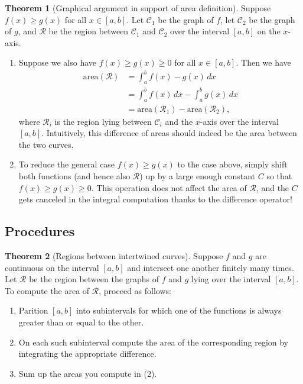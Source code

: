 \documentclass[11pt]{article}
\theoremstyle{definition}
\theoremstyle{named}
\newtheorem*{namedtheorem}{Theorem}
\numberwithin{myalgctr}{section}
\begin{document}
\begin{namedtheorem}[Graphical argument in support of area definition] Suppose $f(x)\geq g(x)$ for all $x\in [a,b]$. Let $\mathcal{C}_1$ be the graph of $f$, let $\mathcal{C}_2$ be the graph of $g$, and $\mathcal{R}$ be the region between $\mathcal{C}_1$ and $\mathcal{C}_2$ over the interval $[a,b]$ on the $x$-axis.
  \begin{enumerate}
    \item Suppose we also have $f(x)\geq g(x)\geq 0$ for all $x\in [a,b]$. Then we have
    \begin{align*}
      \text{area}(\mathcal{R})&=\int_a^b f(x)-g(x)\, dx \\
      &=\int_a^b f(x)\, dx -\int_a^bg(x)\, dx\\
      &=\text{area}(\mathcal{R}_1)-\text{area}(\mathcal{R}_2),
    \end{align*}
    where $\mathcal{R}_i$ is the region lying between $\mathcal{C}_i$ and the $x$-axis over the interval $[a,b]$. Intuitively, this difference of areas should indeed be the area between the two curves.
    \item To reduce the general case $f(x)\geq g(x)$ to the case above, simply shift both functions (and hence also $\mathcal{R}$) up by a large enough constant $C$ so that $f(x)\geq g(x)\geq 0$.  This operation does not affect the area of $\mathcal{R}$, and the $C$ gets canceled in the integral computation thanks to the difference operator!
  \end{enumerate}

\end{namedtheorem}

\subsection*{Procedures}
\begin{namedtheorem}[Regions between intertwined curves] Suppose $f$ and $g$ are continuous on the interval $[a,b]$ and intersect one another finitely many times. Let $\mathcal{R}$ be the region between the graphs of $f$ and $g$ lying over the interval $[a,b]$. To compute the area of $\mathcal{R}$, proceed as follows:
  \begin{enumerate}
    \item Parition $[a,b]$ into subintervals for which one of the functions is always greater than or equal to the other.
    \item On each such subinterval compute the area of the corresponding region by integrating the appropriate difference.
    \item Sum up the areas you compute in (2).
  \end{enumerate}


\end{namedtheorem}
\end{document}
